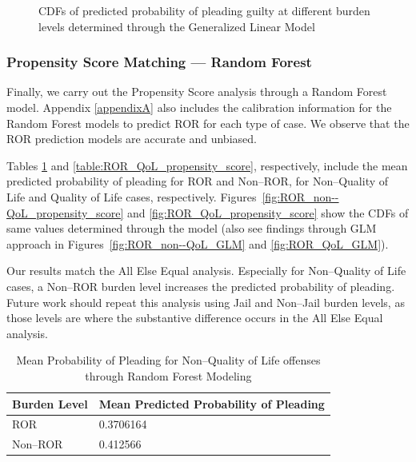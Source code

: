 \begin{figure}[t!]
\begin{subfigure}[b]{0.49\textwidth}
    \label{fig:QoL_plead_GLM}
  \end{subfigure}
  \caption{CDFs of predicted probability of pleading guilty at different burden levels
           determined through the Generalized Linear Model}
\end{figure}


\subsubsection{Propensity Score Matching --- Random Forest}
Finally, we carry out the Propensity Score analysis through a Random Forest model.
Appendix \ref{appendixA}
also includes the calibration information for the Random Forest models to predict ROR for each type of case.
We observe that the ROR prediction models are accurate and unbiased.

Tables \ref{table:ROR_non--QoL_propensity_score} and
       \ref{table:ROR_QoL_propensity_score},
respectively, include the mean predicted probability of pleading for
  ROR and Non--ROR, for
  Non--Quality of Life and Quality of Life cases,
  respectively.
Figures~\ref{fig:ROR_non--QoL_propensity_score} and
        \ref{fig:ROR_QoL_propensity_score} show
the CDFs of same values determined through the model
(also see findings through GLM approach in
Figures~\ref{fig:ROR_non--QoL_GLM} and
        \ref{fig:ROR_QoL_GLM}).


Our results match the All Else Equal analysis.
Especially for Non--Quality of Life cases, a Non--ROR burden level increases the predicted probability of pleading.
Future work should repeat this analysis using
Jail and
Non--Jail burden levels,
as those levels are where the substantive difference occurs in the All Else Equal analysis.


\begin{table}
\centering
  \begin{tabular}{|p{}|p{}|}
    \hline
    \textbf{Burden Level} & \textbf{Mean Predicted Probability of Pleading} \\ \hline
    ROR & 0.3706164 \\ \hline
    Non--ROR & 0.412566 \\ \hline
  \end{tabular}
  \caption{Mean Probability of Pleading for Non--Quality of Life offenses through Random Forest Modeling}%
  \label{table:ROR_non--QoL_propensity_score}
\end{table}


